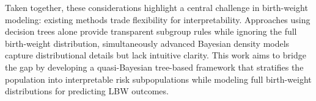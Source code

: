 
Taken together, these considerations highlight a central challenge in birth-weight modeling: existing methods trade flexibility for interpretability. Approaches using decision trees alone provide transparent subgroup rules while ignoring the full birth-weight distribution, simultaneously advanced Bayesian density models capture distributional details but lack intuitive clarity. This work aims to bridge the gap by developing a quasi-Bayesian tree-based framework that stratifies the population into interpretable risk subpopulations while modeling full birth-weight distributions for predicting LBW outcomes.


